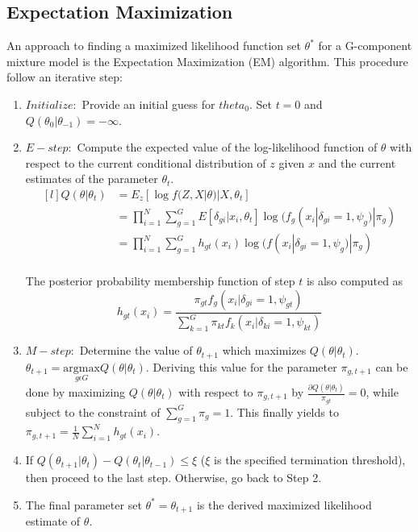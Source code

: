 \subsection{Expectation Maximization}
\label{sec:em}
An approach to finding a maximized likelihood function set \(\theta^*\) for a G-component mixture model is the Expectation Maximization (EM) algorithm. This procedure follow an iterative step:
\begin{enumerate}
    \item \(\mathit{Initialize: }\) Provide an initial guess for \(theta_0\). Set \(t=0\) and \(Q(\theta_0|\theta_{-1})=-\infty\).
    
    \item \(\mathit{E-step: }\) Compute the expected value of the log-likelihood function of \(\theta\) with respect to the current conditional distribution of \(z\) given \(x\) and the current estimates of the parameter \(\theta_t\).
    \[\begin{matrix*}[l]
        Q(\theta|\theta_t) & = E_z[\log f(Z,X|\theta) | X, \theta_t] \\ 
                           & = \prod_{i=1}^{N}\sum_{g=1}^{G}E[\delta_{gi}|x_i,\theta_t] \log(f_g(x_i|\delta_{gi}=1, \psi_g) | \pi_g) \\ 
                           & = \prod_{i=1}^{N}\sum_{g=1}^{G}h_{gt}(x_i) \log(f(x_i|\delta_{gi}=1, \psi_g) | \pi_g) \\ 
        \end{matrix*}\]
    
    The posterior probability membership function of step \(t\) is also computed as
        \[h_{gt}(x_i) = \frac{\pi_{gt}f_g(x_i|\delta_{gi}=1,\psi_{gt})}{\sum_{k=1}^{G}\pi_{kt}f_k(x_i|\delta_{ki}=1,\psi_{kt})}\]

    \item \(\mathit{M-step: }\) Determine the value of \(\theta_{t+1}\) which maximizes \(Q(\theta|\theta_t)\). \(\theta_{t+1}=\underset{g\epsilon G}{\mathrm{argmax}}{Q(\theta|\theta_t)}\). Deriving this value for the parameter \(\pi_{g,t+1}\) can be done by maximizing \(Q(\theta|\theta_t)\) with respect to \(\pi_{g,t+1}\) by \(\frac{\partial Q(\theta|\theta_t)}{\pi_{gt}}=0\), while subject to the constraint of \(\sum_{g=1}^{G}\pi_g=1\). This finally yields to \(\pi_{g,t+1}=\frac{1}{N}\sum_{i=1}^{N}h_{gt}(x_i)\).

    \item If \(Q(\theta_{t+1}|\theta_{t}) - Q(\theta_{t}|\theta_{t-1}) \le \xi \) (\(\xi \) is the specified termination threshold), then proceed to the last step. Otherwise, go back to Step 2.
    
    \item The final parameter set \(\theta^* = \theta_{t+1}\) is the derived maximized likelihood estimate of \(\theta\).
    
\end{enumerate}








